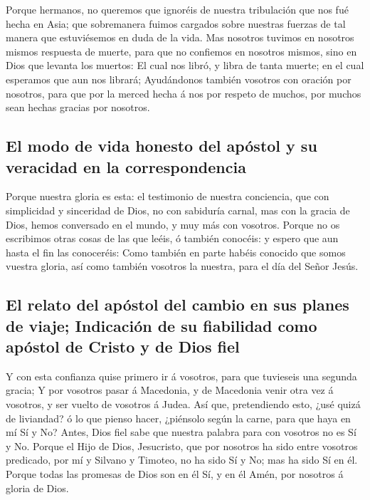  Porque hermanos, no queremos que ignoréis de nuestra
tribulación que nos fué hecha en Asia; que sobremanera fuimos cargados
sobre nuestras fuerzas de tal manera que estuviésemos en duda de la
vida.  Mas nosotros tuvimos en nosotros mismos respuesta
de muerte, para que no confiemos en nosotros mismos, sino en Dios que
levanta los muertos:  El cual nos libró, y libra de tanta
muerte; en el cual esperamos que aun nos librará; 
Ayudándonos también vosotros con oración por nosotros, para que por la
merced hecha á nos por respeto de muchos, por muchos sean hechas gracias
por nosotros.

\hypertarget{el-modo-de-vida-honesto-del-apuxf3stol-y-su-veracidad-en-la-correspondencia}{%
\subsection{El modo de vida honesto del apóstol y su veracidad en la
correspondencia}\label{el-modo-de-vida-honesto-del-apuxf3stol-y-su-veracidad-en-la-correspondencia}}

 Porque nuestra gloria es esta: el testimonio de nuestra
conciencia, que con simplicidad y sinceridad de Dios, no con sabiduría
carnal, mas con la gracia de Dios, hemos conversado en el mundo, y muy
más con vosotros.  Porque no os escribimos otras cosas de
las que leéis, ó también conocéis: y espero que aun hasta el fin las
conoceréis:  Como también en parte habéis conocido que
somos vuestra gloria, así como también vosotros la nuestra, para el día
del Señor Jesús.

\hypertarget{el-relato-del-apuxf3stol-del-cambio-en-sus-planes-de-viaje-indicaciuxf3n-de-su-fiabilidad-como-apuxf3stol-de-cristo-y-de-dios-fiel}{%
\subsection{El relato del apóstol del cambio en sus planes de viaje;
Indicación de su fiabilidad como apóstol de Cristo y de Dios
fiel}\label{el-relato-del-apuxf3stol-del-cambio-en-sus-planes-de-viaje-indicaciuxf3n-de-su-fiabilidad-como-apuxf3stol-de-cristo-y-de-dios-fiel}}

 Y con esta confianza quise primero ir á vosotros, para
que tuvieseis una segunda gracia;  Y por vosotros pasar á
Macedonia, y de Macedonia venir otra vez á vosotros, y ser vuelto de
vosotros á Judea.  Así que, pretendiendo esto, ¿usé quizá
de liviandad? ó lo que pienso hacer, ¿piénsolo según la carne, para que
haya en mí Sí y No?  Antes, Dios fiel sabe que nuestra
palabra para con vosotros no es Sí y No.  Porque el Hijo
de Dios, Jesucristo, que por nosotros ha sido entre vosotros predicado,
por mí y Silvano y Timoteo, no ha sido Sí y No; mas ha sido Sí en él.
 Porque todas las promesas de Dios son en él Sí, y en él
Amén, por nosotros á gloria de Dios.

